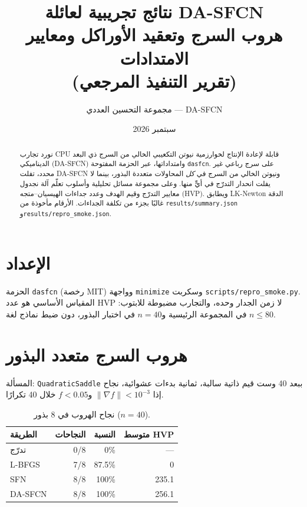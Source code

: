 \documentclass[12pt,a4paper]{article}
\title{\textbf{نتائج تجريبية لعائلة DA-SFCN}\\
\large هروب السرج وتعقيد الأوراكل ومعايير الامتدادات\\
\large (تقرير التنفيذ المرجعي)}
\author{مجموعة التحسين العددي --- DA-SFCN}
\date{سبتمبر 2026}
\begin{document}
\maketitle

\begin{abstract}
نورد تجارب \textenglish{CPU} قابلة لإعادة الإنتاج لخوارزمية نيوتن التكعيبي
الخالي من السرج ذي البعد الديناميكي \textenglish{(DA-SFCN)} وامتداداتها، عبر
الحزمة المفتوحة \texttt{dasfcn}. على سرج رباعي غير محدد، تفلت
\textenglish{DA-SFCN} ونيوتن الخالي من السرج في \emph{كل} المحاولات متعددة
البذور، بينما لا يفلت انحدار التدرّج في أيٍّ منها. وعلى مجموعة مسائل تحليلية
وأسلوب تعلّم آلة نجدول معايير التدرّج وقيم الهدف وعدد جداءات الهيسيان--متجه
\textenglish{(HVP)}. ويطابق \textenglish{LK-Newton} الدقة غالبًا بجزء من تكلفة
الجداءات. الأرقام مأخوذة من
\texttt{results/summary.json} و\texttt{results/repro\_smoke.json}.
\end{abstract}

\section{الإعداد}
الحزمة \texttt{dasfcn} (رخصة \textenglish{MIT}) وواجهة
\texttt{minimize} وسكربت \texttt{scripts/repro\_smoke.py}.
المقياس الأساسي هو عدد \textenglish{HVP} لا زمن الجدار وحده، والتجارب مضبوطة
للابتوب: $n\le 80$ في المجموعة الرئيسية و$n=40$ في اختبار البذور، دون ضبط
نماذج لغة.

\section{هروب السرج متعدد البذور}
المسألة: \texttt{QuadraticSaddle} ببعد 40 وست قيم ذاتية سالبة، ثمانية
بدءات عشوائية، نجاح إذا $\|\nabla f\|<10^{-3}$ و$f<0.05$ خلال 40 تكرارًا.

\begin{table}[h]
\centering
\caption{نجاح الهروب في 8 بذور ($n=40$).}
\begin{tabular}{@{}lrrr@{}}
\toprule
الطريقة & النجاحات & النسبة & متوسط \textenglish{HVP} \\
\midrule
تدرّج & 0/8 & 0\% & --- \\
\textenglish{L-BFGS} & 7/8 & 87.5\% & 0 \\
\textenglish{SFN} & 8/8 & 100\% & 235.1 \\
\textenglish{DA-SFCN} & 8/8 & 100\% & 256.1 \\
\bottomrule
\end{tabular}
\end{table}
\end{document}
